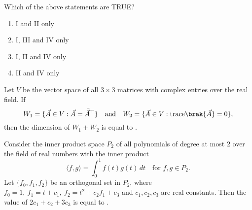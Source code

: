 Which of the above statements are TRUE?
\hfill{}
\begin{enumerate}
\item I and II only
\item I, III and IV only
\item I, II and IV only
\item II and IV only
\end{enumerate}
\item Let $V$ be the vector space of all $3\times 3$ matrices with complex entries over the real field. If
\[
W_{1}=\{\vec{A}\in V : \vec{A}=\bar{\vec{A}}^{\top}\}\quad \text{and}\quad W_{2}=\{\vec{A}\in V : \text{trace}\brak{\vec{A}}=0\},
\]
then the dimension of $W_{1}+W_{2}$ is equal to \underline{\hspace{2cm}}.  
\hfill{}
\item Consider the inner product space $P_{2}$ of all polynomials of degree at most $2$ over the field of real numbers with the inner product 
\[
\langle f,g\rangle = \int_{0}^{1} f(t)g(t)\, dt \quad \text{for } f,g \in P_{2}.
\]
Let $\{f_{0},f_{1},f_{2}\}$ be an orthogonal set in $P_{2}$, where $f_{0}=1,\ f_{1}=t+c_{1},\ f_{2}=t^{2}+c_{2}f_{1}+c_{3}$ and $c_{1},c_{2},c_{3}$ are real constants. Then the value of $2c_{1}+c_{2}+3c_{3}$ is equal to \underline{\hspace{2cm}}.
\hfill{}

